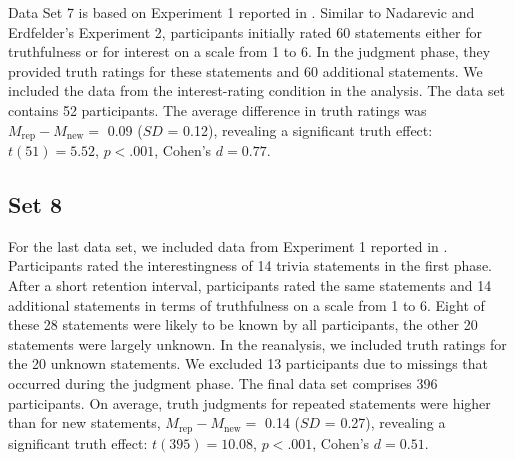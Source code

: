 \documentclass[
  english,
  ,man,floatsintext]{apa6}
\begin{document}
\begin{appendix}
Data Set 7 is based on Experiment 1 reported in \textcite{brashier2020}.
Similar to Nadarevic and Erdfelder's \autocite*{nadarevic2014}
Experiment 2, participants initially rated 60 statements either for
truthfulness or for interest on a scale from 1 to 6. In the judgment
phase, they provided truth ratings for these statements and 60
additional statements. We included the data from the interest-rating
condition in the analysis. The data set contains 52 participants. The
average difference in truth ratings was
\(M_\text{rep} - M_\text{new} =\) 0.09 (\(SD\) = 0.12), revealing a
significant truth effect: \(t(51) = 5.52\), \(p < .001\), Cohen's
\(d = 0.77\).

\hypertarget{set-8}{%
\subsection{Set 8}\label{set-8}}

For the last data set, we included data from Experiment 1 reported in
\textcite{pennycook2018}. Participants rated the interestingness of 14
trivia statements in the first phase. After a short retention interval,
participants rated the same statements and 14 additional statements in
terms of truthfulness on a scale from 1 to 6. Eight of these 28
statements were likely to be known by all participants, the other 20
statements were largely unknown. In the reanalysis, we included truth
ratings for the 20 unknown statements. We excluded 13 participants due
to missings that occurred during the judgment phase. The final data set
comprises 396 participants. On average, truth judgments for repeated
statements were higher than for new statements,
\(M_\text{rep} - M_\text{new} =\) 0.14 (\(SD\) = 0.27), revealing a
significant truth effect: \(t(395) = 10.08\), \(p < .001\), Cohen's
\(d = 0.51\).
\end{appendix}

\clearpage
\makeatletter
\efloat@restorefloats
\makeatother
\end{document}
